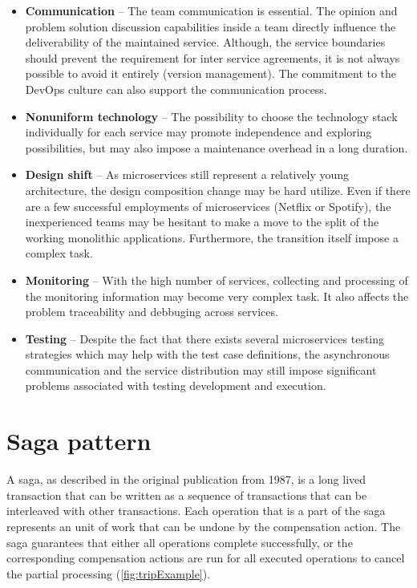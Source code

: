\documentclass[oneside,
  digital, %
  table,   %
  nolof,     %
  nolot,     %
]{fithesis3}
\begin{document}
\begin{itemize}
    \item \textbf{Communication} -- The team communication is essential. The opinion and problem solution discussion capabilities inside a team directly influence the deliverability of the maintained service. Although, the service boundaries should prevent the requirement for inter service agreements, it is not always possible to avoid it entirely (version management). The commitment to the DevOps culture can also support the communication process.
    
    \item \textbf{Nonuniform technology} -- The possibility to choose the technology stack individually for each service may promote independence and exploring possibilities, but may also impose a maintenance overhead in a long duration.  
    
    \item \textbf{Design shift} -- As microservices still represent a relatively young architecture, the design composition change may be hard utilize. Even if there are a few successful employments of microservices (Netflix or Spotify), the inexperienced teams may be hesitant to make a move to the split of the working monolithic applications. Furthermore, the transition itself impose a complex task.
    
    \item \textbf{Monitoring} -- With the high number of services, collecting and processing of the monitoring information may become very complex task. It also affects the problem traceability and debbuging across services.
    
    \item \textbf{Testing} -- Despite the fact that there exists several microservices testing strategies \cite{ms_testing_strategies} which may help with the test case definitions, the asynchronous communication and the service distribution may still impose significant problems associated with testing development and execution.
\end{itemize}





\clearpage
\chapter{Saga pattern}

A saga, as described in the original publication \cite{sagas_publ} from 1987, is a long lived transaction that can be written as a sequence of transactions that can be interleaved with other transactions. Each operation that is a part of the saga represents an unit of work that can be undone by the compensation action. The saga guarantees that either all operations complete successfully, or the corresponding compensation actions are run for all executed operations to cancel the partial processing (\ref{fig:tripExample}).
\end{document}
